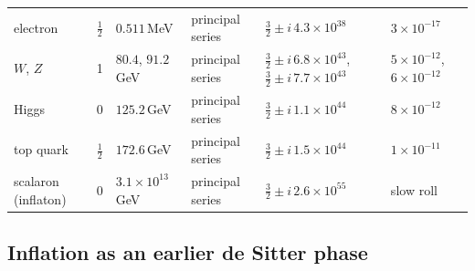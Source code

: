 \documentclass[reprint,aps,prd,amsmath,amssymb,superscriptaddress,nofootinbib,floatfix]{revtex4-2}
\theoremstyle{plain}
\theoremstyle{definition}
\theoremstyle{remark}
\begin{document}
\begin{table}[t]
\begin{ruledtabular}
\begin{tabular}{llllll}
\parbox[t]{0.17\textwidth}{\raggedright electron\strut} & \parbox[t]{0.05\textwidth}{\raggedright $\tfrac12$\strut} & \parbox[t]{0.14\textwidth}{\raggedright $0.511$\,MeV\strut} & \parbox[t]{0.25\textwidth}{\raggedright principal series\strut} & \parbox[t]{0.18\textwidth}{\raggedright $\tfrac32\pm i\,4.3\times10^{38}$\strut} & \parbox[t]{0.11\textwidth}{\raggedright $3\times10^{-17}$\strut} \\
\parbox[t]{0.17\textwidth}{\raggedright $W$, $Z$\strut} & \parbox[t]{0.05\textwidth}{\raggedright 1\strut} & \parbox[t]{0.14\textwidth}{\raggedright $80.4$, $91.2$\,GeV\strut} & \parbox[t]{0.25\textwidth}{\raggedright principal series\strut} & \parbox[t]{0.18\textwidth}{\raggedright $\tfrac32\pm i\,6.8\times10^{43}$, $\tfrac32\pm i\,7.7\times10^{43}$\strut} & \parbox[t]{0.11\textwidth}{\raggedright $5\times10^{-12}$, $6\times10^{-12}$\strut} \\
\parbox[t]{0.17\textwidth}{\raggedright Higgs\strut} & \parbox[t]{0.05\textwidth}{\raggedright 0\strut} & \parbox[t]{0.14\textwidth}{\raggedright $125.2$\,GeV\strut} & \parbox[t]{0.25\textwidth}{\raggedright principal series\strut} & \parbox[t]{0.18\textwidth}{\raggedright $\tfrac32\pm i\,1.1\times10^{44}$\strut} & \parbox[t]{0.11\textwidth}{\raggedright $8\times10^{-12}$\strut} \\
\parbox[t]{0.17\textwidth}{\raggedright top quark\strut} & \parbox[t]{0.05\textwidth}{\raggedright $\tfrac12$\strut} & \parbox[t]{0.14\textwidth}{\raggedright $172.6$\,GeV\strut} & \parbox[t]{0.25\textwidth}{\raggedright principal series\strut} & \parbox[t]{0.18\textwidth}{\raggedright $\tfrac32\pm i\,1.5\times10^{44}$\strut} & \parbox[t]{0.11\textwidth}{\raggedright $1\times10^{-11}$\strut} \\
\parbox[t]{0.17\textwidth}{\raggedright scalaron (inflaton)\strut} & \parbox[t]{0.05\textwidth}{\raggedright 0\strut} & \parbox[t]{0.14\textwidth}{\raggedright $3.1\times10^{13}$\,GeV\strut} & \parbox[t]{0.25\textwidth}{\raggedright principal series\strut} & \parbox[t]{0.18\textwidth}{\raggedright $\tfrac32\pm i\,2.6\times10^{55}$\strut} & \parbox[t]{0.11\textwidth}{\raggedright slow roll\strut}
\end{tabular}
\end{ruledtabular}
\end{table}

\subsection{Inflation as an earlier de Sitter phase}
\label{sec:inflation}
\end{document}
